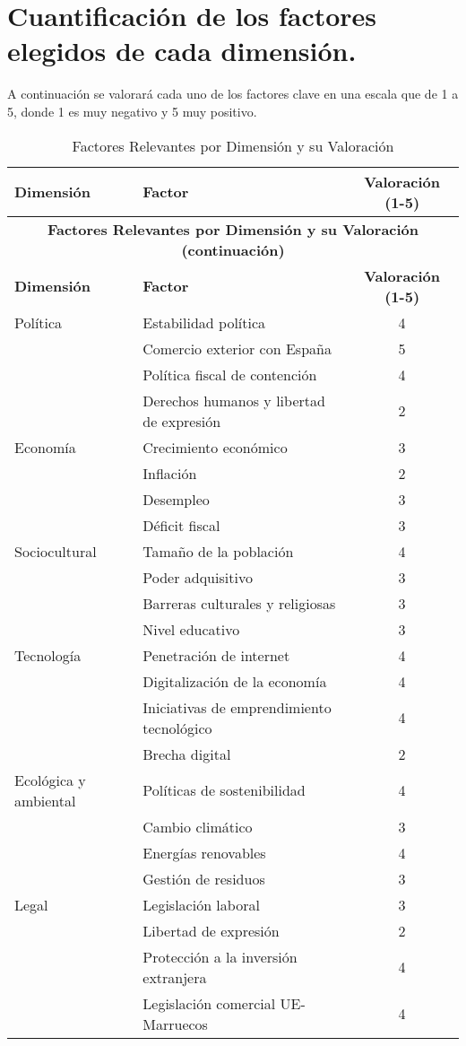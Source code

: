 \documentclass{article}  %
\begin{document}
\section{Cuantificación de los factores elegidos de cada dimensión.}

A continuación se valorará cada uno de los factores clave en una escala que de 1 a 5, donde 1 es muy negativo y 5 muy positivo.

\begin{longtable}{|l|l|c|}
\caption{Factores Relevantes por Dimensión y su Valoración} \label{tab:factores_valoracion} \\

\hline
\textbf{Dimensión} & \textbf{Factor} & \textbf{Valoración (1-5)} \\
\hline
\endfirsthead

\hline
\multicolumn{3}{|c|}{\textbf{Factores Relevantes por Dimensión y su Valoración (continuación)}} \\
\hline
\textbf{Dimensión} & \textbf{Factor} & \textbf{Valoración (1-5)} \\
\hline
\endhead

\hline
\endfoot

\hline
Política & Estabilidad política         & 4 \\
 & Comercio exterior con España & 5 \\
 & Política fiscal de contención & 4 \\
 & Derechos humanos y libertad de expresión & 2 \\
\hline
Economía & Crecimiento económico        & 3 \\
 & Inflación                    & 2 \\
 & Desempleo                    & 3 \\
 & Déficit fiscal               & 3 \\
\hline
Sociocultural & Tamaño de la población       & 4 \\
 & Poder adquisitivo            & 3 \\
 & Barreras culturales y religiosas & 3 \\
 & Nivel educativo              & 3 \\
\hline
Tecnología & Penetración de internet      & 4 \\
 & Digitalización de la economía & 4 \\
 & Iniciativas de emprendimiento tecnológico & 4 \\
 & Brecha digital               & 2 \\
\hline
Ecológica y ambiental & Políticas de sostenibilidad & 4 \\
 & Cambio climático             & 3 \\
 & Energías renovables          & 4 \\
 & Gestión de residuos          & 3 \\
\hline
Legal & Legislación laboral          & 3 \\
 & Libertad de expresión        & 2 \\
 & Protección a la inversión extranjera & 4 \\
 & Legislación comercial UE-Marruecos & 4 \\
\hline
\end{longtable}
\end{document}
